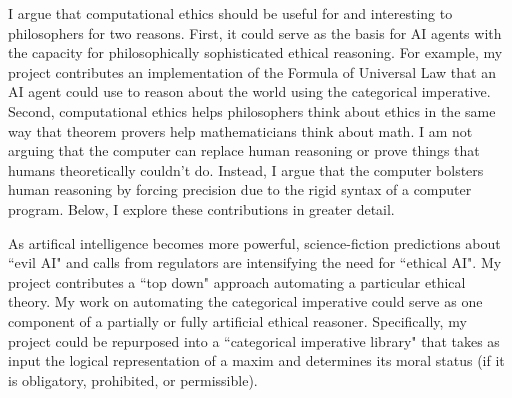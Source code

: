 %
\begin{isabellebody}%
%
%
\isadelimtheory
%
\endisadelimtheory
%
\isatagtheory
%
\endisatagtheory
{\isafoldtheory}%
%
\isadelimtheory
%
\endisadelimtheory
%
\isadelimdocument
%
\endisadelimdocument
%
\isatagdocument
%
\isamarkuptrue%
%
\endisatagdocument
{\isafolddocument}%
%
\isadelimdocument
%
\endisadelimdocument
%
\begin{isamarkuptext}%
I argue that computational ethics should be useful for and interesting to philosophers for two 
reasons. First, it could serve as the basis for AI agents with the capacity for philosophically sophisticated 
ethical reasoning. For example, my project contributes an implementation of the Formula of Universal Law
that an AI agent could use to reason about the world using the categorical imperative. Second, computational 
ethics helps philosophers think about ethics in the same way that theorem provers help 
mathematicians think about math. I am not arguing that the computer can replace human reasoning or prove things
that humans theoretically couldn't do. Instead, I argue that the computer bolsters human reasoning by forcing precision due to 
the rigid syntax of a computer program. Below, I explore 
these contributions in greater detail.%
\end{isamarkuptext}\isamarkuptrue%
%
\isadelimdocument
%
\endisadelimdocument
%
\isatagdocument
%
\isamarkuptrue%
%
\endisatagdocument
{\isafolddocument}%
%
\isadelimdocument
%
\endisadelimdocument
%
\begin{isamarkuptext}%
As artifical intelligence becomes more powerful, science-fiction predictions about ``evil AI"
and calls from regulators are intensifying the need for ``ethical AI". My project contributes a ``top down" 
approach automating a particular ethical theory. My work on automating the categorical imperative 
could serve as one component of a partially or fully artificial ethical reasoner. Specifically, my 
project could be repurposed into a ``categorical imperative library" that takes as input the logical representation of a maxim 
and determines its moral status (if it is obligatory, prohibited, or permissible).


\end{isamarkuptext}
\end{isabellebody}
